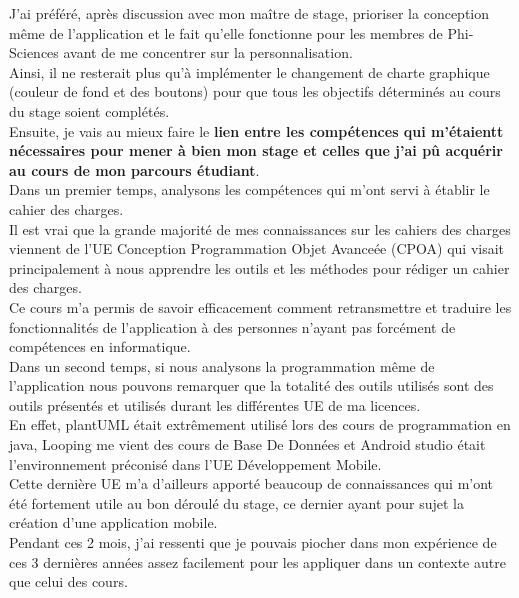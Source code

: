 \documentclass[11pt, twoside]{article}
\begin{document}
J'ai préféré, après discussion avec mon maître de stage, prioriser la conception même de l'application et le fait qu'elle fonctionne pour les membres de Phi-Sciences avant de me concentrer sur la personnalisation.
\vspace*{0.2cm}\\
Ainsi, il ne resterait plus qu'à implémenter le changement de charte graphique (couleur de fond et des boutons) pour que tous les objectifs déterminés au cours du stage soient complétés.
\vspace*{0.3cm}\\
Ensuite, je vais au mieux faire le \textbf{lien entre les compétences qui m'étaientt nécessaires pour mener à bien mon stage et celles que j'ai pû acquérir au cours de mon parcours étudiant}.
\vspace*{0.2cm}\\
Dans un premier temps, analysons les compétences qui m'ont servi à établir le cahier des charges.
\vspace*{0.2cm}\\
Il est vrai que la grande majorité de mes connaissances sur les cahiers des charges viennent de l'UE Conception Programmation Objet Avanceée (CPOA) qui visait principalement à nous apprendre les outils et les méthodes pour rédiger un cahier des charges.\\
Ce cours m'a permis de savoir efficacement comment retransmettre et traduire les fonctionnalités de l'application à des personnes n'ayant pas forcément de compétences en informatique.
\vspace*{0.2cm}\\
Dans un second temps, si nous analysons la programmation même de l'application nous pouvons remarquer que la totalité des outils utilisés sont des outils présentés et utilisés durant les différentes UE de ma licences.\\
En effet, plantUML était extrêmement utilisé lors des cours de programmation en java, Looping me vient des cours de Base De Données et Android studio était l'environnement préconisé dans l'UE Développement Mobile.\\
Cette dernière UE m'a d'ailleurs apporté beaucoup de connaissances qui m'ont été fortement utile au bon déroulé du stage, ce dernier ayant pour sujet la création d'une application mobile.
\vspace*{0.2cm}\\
Pendant ces 2 mois, j'ai ressenti que je pouvais piocher dans mon expérience de ces 3 dernières années assez facilement pour les appliquer dans un contexte autre que celui des cours.
\end{document}
